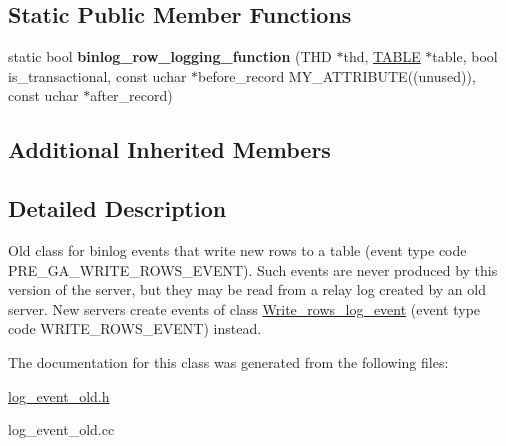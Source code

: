 \subsection*{Static Public Member Functions}
\begin{DoxyCompactItemize}
\item 
\mbox{\label{classWrite__rows__log__event__old_ae476953d8a7a0dbcba71c118acbdcb13}} 
static bool {\bfseries binlog\+\_\+row\+\_\+logging\+\_\+function} (T\+HD $\ast$thd, \mbox{\hyperlink{structTABLE}{T\+A\+B\+LE}} $\ast$table, bool is\+\_\+transactional, const uchar $\ast$before\+\_\+record M\+Y\+\_\+\+A\+T\+T\+R\+I\+B\+U\+TE((unused)), const uchar $\ast$after\+\_\+record)
\end{DoxyCompactItemize}
\subsection*{Additional Inherited Members}


\subsection{Detailed Description}
Old class for binlog events that write new rows to a table (event type code P\+R\+E\+\_\+\+G\+A\+\_\+\+W\+R\+I\+T\+E\+\_\+\+R\+O\+W\+S\+\_\+\+E\+V\+E\+NT). Such events are never produced by this version of the server, but they may be read from a relay log created by an old server. New servers create events of class \mbox{\hyperlink{classWrite__rows__log__event}{Write\+\_\+rows\+\_\+log\+\_\+event}} (event type code W\+R\+I\+T\+E\+\_\+\+R\+O\+W\+S\+\_\+\+E\+V\+E\+NT) instead. 

The documentation for this class was generated from the following files\+:\begin{DoxyCompactItemize}
\item 
\mbox{\hyperlink{log__event__old_8h}{log\+\_\+event\+\_\+old.\+h}}\item 
log\+\_\+event\+\_\+old.\+cc\end{DoxyCompactItemize}
